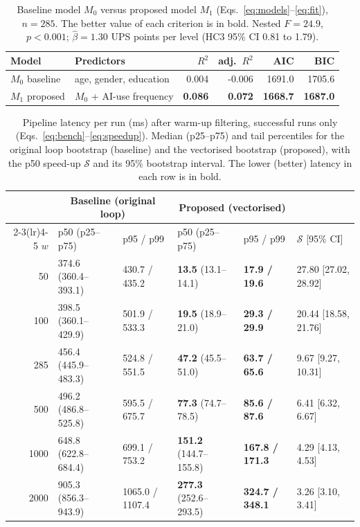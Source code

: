 \begin{table}[t]
\centering
\caption{Baseline model $M_0$ versus proposed model $M_1$ (Eqs.~\ref{eq:models}--\ref{eq:fit}), $n=285$. The better value of each criterion is in bold. Nested $F=24.9$, $p <0.001$; $\hat\beta=1.30$ UPS points per level (HC3 95\% CI 0.81 to 1.79).}
\label{tab:models}
\small
\begin{tabular}{@{}llrrrr@{}}
\toprule
Model & Predictors & $R^2$ & adj.\ $R^2$ & AIC & BIC\\
\midrule
$M_0$ baseline & age, gender, education & 0.004 & -0.006 & 1691.0 & 1705.6\\
$M_1$ proposed & $M_0$ + AI-use frequency & \textbf{0.086} & \textbf{0.072} & \textbf{1668.7} & \textbf{1687.0}\\
\bottomrule
\end{tabular}
\end{table}

\begin{table}[!htbp]
\centering
\caption{Pipeline latency per run (ms) after warm-up filtering, successful runs only (Eqs.~\ref{eq:bench}--\ref{eq:speedup}). Median (p25--p75) and tail percentiles for the original loop bootstrap (baseline) and the vectorised bootstrap (proposed), with the p50 speed-up $\mathcal{S}$ and its 95\% bootstrap interval. The lower (better) latency in each row is in bold.}
\label{tab:latency}
\footnotesize\setlength{\tabcolsep}{4pt}
\begin{tabular}{@{}r ll ll l@{}}
\toprule
& \multicolumn{2}{c}{Baseline (original loop)} & \multicolumn{2}{c}{Proposed (vectorised)} & \\
\cmidrule(lr){2-3}\cmidrule(lr){4-5}
$w$ & p50 (p25--p75) & p95 / p99 & p50 (p25--p75) & p95 / p99 & $\mathcal{S}$ [95\% CI]\\
\midrule

50 & 374.6 (360.4--393.1) & 430.7 / 435.2 & \textbf{13.5} (13.1--14.1) & \textbf{17.9 / 19.6} & 27.80 [27.02, 28.92]\\

100 & 398.5 (360.1--429.9) & 501.9 / 533.3 & \textbf{19.5} (18.9--21.0) & \textbf{29.3 / 29.9} & 20.44 [18.58, 21.76]\\

285 & 456.4 (445.9--483.3) & 524.8 / 551.5 & \textbf{47.2} (45.5--51.0) & \textbf{63.7 / 65.6} & 9.67 [9.27, 10.31]\\

500 & 496.2 (486.8--525.8) & 595.5 / 675.7 & \textbf{77.3} (74.7--78.5) & \textbf{85.6 / 87.6} & 6.41 [6.32, 6.67]\\

1000 & 648.8 (622.8--684.4) & 699.1 / 753.2 & \textbf{151.2} (144.7--155.8) & \textbf{167.8 / 171.3} & 4.29 [4.13, 4.53]\\

2000 & 905.3 (856.3--943.9) & 1065.0 / 1107.4 & \textbf{277.3} (252.6--293.5) & \textbf{324.7 / 348.1} & 3.26 [3.10, 3.41]\\

\bottomrule
\end{tabular}
\end{table}
